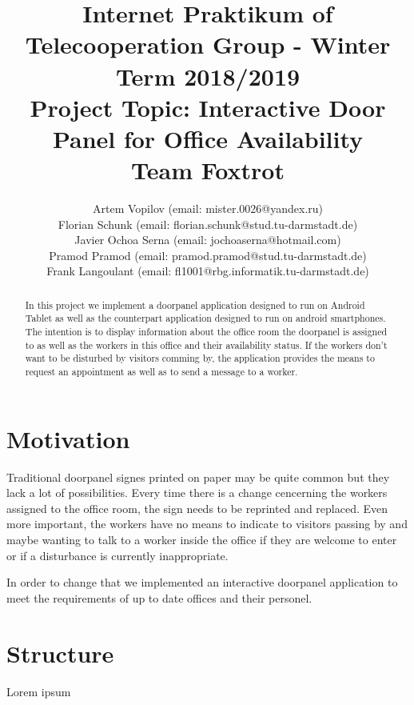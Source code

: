 \documentclass[article,colorback,accentcolor=tud4c, 11pt]{tudreport}
\title{Internet Praktikum of Telecooperation Group - Winter Term 2018/2019\\
	Project Topic: Interactive Door Panel for Office Availability\\ Team Foxtrot}
\subtitle{Artem Vopilov (email: mister.0026@yandex.ru)\\Florian Schunk (email: florian.schunk@stud.tu-darmstadt.de)\\ Javier Ochoa Serna (email: jochoaserna@hotmail.com)\\
	Pramod Pramod (email: pramod.pramod@stud.tu-darmstadt.de) \\ Frank Langoulant (email: fl1001@rbg.informatik.tu-darmstadt.de)}
\begin{document}
	\maketitle
	\begin{abstract}
		In this project we implement a doorpanel application designed to run on  Android Tablet as well as the counterpart application designed to run on android smartphones. The intention is to display information about the office room the doorpanel is assigned to as well as the workers in this office and their availability status. If the workers don't want to be disturbed by visitors comming by, the application provides the means to request an appointment as well as to send a message to a worker.
	\end{abstract}  
	
	\tableofcontents
	\newpage
	
	\section{Motivation}
	
Traditional doorpanel signes printed on paper may be quite common but they lack a lot of possibilities. Every time there is a change cencerning the workers assigned to the office room, the sign needs to be reprinted and replaced. Even more important, the workers have no means to indicate to visitors passing by and maybe wanting to talk to a worker inside the office if they are welcome to enter or if a disturbance is currently inappropriate.

In order to change that we implemented an interactive doorpanel application to meet the requirements of up to date offices and their personel. 


	\section{Structure}
	Lorem ipsum  
	
	
\end{document}
